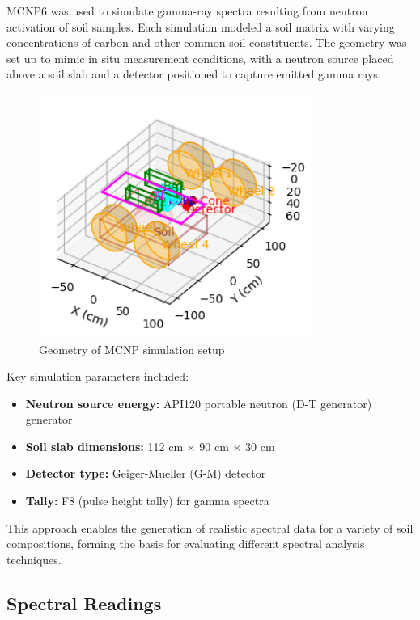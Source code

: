 \documentclass[review]{elsarticle}
\begin{document}
MCNP6 was used to simulate gamma-ray spectra resulting from neutron activation of soil samples. Each simulation modeled a soil matrix with varying concentrations of carbon and other common soil constituents. The geometry was set up to mimic in situ measurement conditions, with a neutron source placed above a soil slab and a detector positioned to capture emitted gamma rays.

\begin{figure}[H]
\centering
\includegraphics[width=0.8\textwidth]{../Figures/DataGeneration/MCNPGeometry.png}
\caption{Geometry of MCNP simulation setup}
\label{fig:mcnp_geometry}
\end{figure}

Key simulation parameters included:

\begin{itemize}
\item \textbf{Neutron source energy:} API120 portable neutron (D-T generator) generator~\cite{kavetskiy2018}
\item \textbf{Soil slab dimensions:} 112 cm × 90 cm × 30 cm
\item \textbf{Detector type:} Geiger-Mueller (G-M) detector~\cite{yakubova2025}
\item \textbf{Tally:} F8 (pulse height tally) for gamma spectra
\end{itemize}

This approach enables the generation of realistic spectral data for a variety of soil compositions, forming the basis for evaluating different spectral analysis techniques.

\subsection{Spectral Readings}
\end{document}
